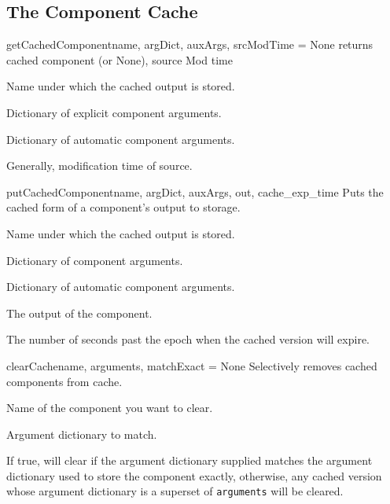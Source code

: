 \subsection{The Component Cache}
\begin{funcdesc}{getCachedComponent}{name, argDict, auxArgs, srcModTime = None}
returns cached component (or None),  source Mod time
\begin{argdesc}
\item[name] Name under which the cached output is stored.
\item[argDict] Dictionary of explicit component arguments.  
\item[auxArgs] Dictionary of automatic component arguments.
\item[srcModTime] Generally, modification time of source.
\end{argdesc}
\end{funcdesc}


\begin{funcdesc}{putCachedComponent}{name, argDict, auxArgs, out, cache_exp_time}
Puts the cached form of a component's output to storage.
\begin{argdesc}
\item[name]  Name under which the cached output is stored. 
\item[argDict] Dictionary of component arguments.  
\item[auxArgs]  Dictionary of automatic component arguments.
\item[out] The output of the component.
\item[cache_exp_time] The number of seconds past the epoch when the
cached version will expire.
\end{argdesc}
\end{funcdesc}


\begin{funcdesc}{clearCache}{name, arguments, matchExact = None}
Selectively removes cached components from cache.
\begin{argdesc}
\item[name] Name of the component you want to clear.
\item[arguments] Argument dictionary to match.
\item[matchExact] If true, will clear  if the argument
dictionary supplied matches the argument dictionary used to store the
component exactly, otherwise, any cached version whose argument
dictionary is a superset of \texttt{arguments} will be cleared.
\end{argdesc}

\end{funcdesc}




